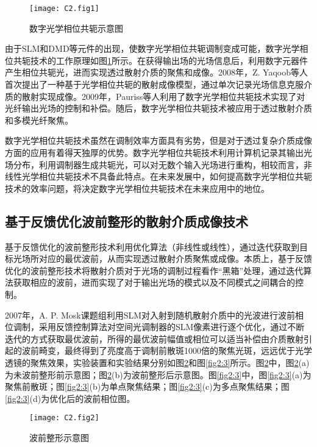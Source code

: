 \begin{figure}[htp]
	\centering
	\texttt{[image: C2.fig1]}
	\caption{数字光学相位共轭示意图}
	\label{fig2:1}
\end{figure}

由于SLM和DMD等元件的出现，使数字光学相位共轭调制变成可能，数字光学相位共轭技术的工作原理如图\ref{fig2:1}所示。在获得输出场的光场信息后，利用数字元器件产生相位共轭光，进而实现透过散射介质的聚焦和成像。2008年，Z. Yaqoob等人首次提出了一种基于光学相位共轭的散射成像模型，通过单次记录光场信息克服介质的散射实现成像。2009年，Pauriss等人利用了数字光学相位共轭技术实现了对光纤输出光场的控制和补偿。随后，数字光学相位共轭技术被应用于透过散射介质和多模光纤聚焦。

数字光学相位共轭技术虽然在调制效率方面具有劣势，但是对于透过复杂介质成像方面的应用有着得天独厚的优势。数字光学相位共轭技术利用计算机记录其输出光场分布，利用调制器生成共轭光，可以对无数个输入光场进行重构，相较而言，非线性光学相位共轭技术不具备此特点。在未来发展中，如何提高数字光学相位共轭技术的效率问题，将决定数字光学相位共轭技术在未来应用中的地位。

\subsection{基于反馈优化波前整形的散射介质成像技术}

基于反馈优化的波前整形技术利用优化算法（非线性或线性），通过迭代获取到目标光场所对应的最优波前，从而实现透过散射介质聚焦或成像。本质上，基于反馈优化的波前整形技术将散射介质对于光场的调制过程看作“黑箱”处理，通过迭代算法获取相应的波前，进而实现了对于输出光场的模式以及不同模式之间耦合的控制。

2007年，A. P. Mosk课题组利用SLM对入射到随机散射介质中的光波进行波前相位调制，采用反馈控制算法对空间光调制器的SLM像素进行逐个优化，通过不断迭代的方式获取最优波前，所得的最优波前幅值或相位可以适当补偿由介质散射引起的波前畸变，最终得到了亮度高于调制前散斑1000倍的聚焦光斑，远远优于光学透镜的聚焦效果，实验装置和实验结果分别如图\ref{fig2:2}和图\ref{fig2:3}所示。图\ref{fig2:2}中，图\ref{fig2:2}(a)为未波前整形前示意图；图\ref{fig2:2}(b)为波前整形后示意图。图\ref{fig2:3}中，图\ref{fig2:3}(a)为聚焦前散斑；图\ref{fig2:3}(b)为单点聚焦结果；图\ref{fig2:3}(c)为多点聚焦结果；图\ref{fig2:3}(d)为优化后的波前相位图。

\begin{figure}[htp]
	\centering
	\texttt{[image: C2.fig2]}
	\caption{波前整形示意图}
	\label{fig2:2}
\end{figure}

